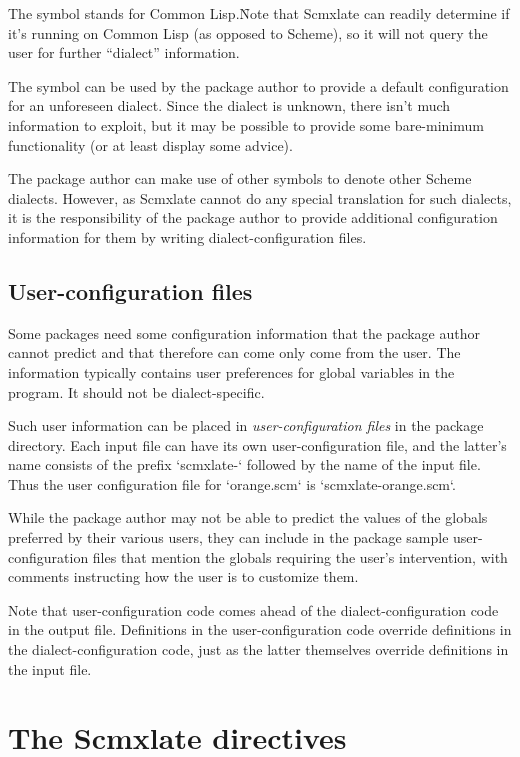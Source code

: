 The symbol  stands for
Common Lisp.\f{Note that
Scmxlate can readily determine if it’s running
on Common Lisp (as opposed to Scheme), so it will not query the user
for further “dialect” information.}

The symbol  can be used by the package author
to provide a default configuration for an unforeseen
dialect.  Since the dialect is unknown, there isn’t
much information to exploit, but it may be
possible to provide some bare-minimum functionality
(or at least display some advice).

The package author can make use of other symbols to
denote other Scheme dialects.  However, as Scmxlate
cannot do any special translation for such dialects, it
is the responsibility of the package author to provide
additional configuration information for them by
writing dialect-configuration files.

\subsection{User-configuration files}

Some packages need some configuration information that
the package author cannot predict and that therefore
can come only come from the user.  The information
typically contains user preferences for global
variables in the program.  It should not be
dialect-specific.

Such user information can be placed in {\em
user-configuration files} in the package directory.
Each input file can have its own
user-configuration file, and the latter’s name
consists of the prefix `scmxlate-` followed by the
name of the input file.  Thus the user configuration
file for `orange.scm` is `scmxlate-orange.scm`.

While the package author may not be able to predict the
values of the globals preferred by their various
users, they can include in the package sample
user-configuration files that mention the globals
requiring the user’s intervention, with comments
instructing how the user is to customize them.

Note that user-configuration code comes ahead of the
dialect-configuration code in the output file.
Definitions in the user-configuration code override
definitions in the dialect-configuration code, just
as the latter themselves override definitions in the
input file.

\section{The Scmxlate directives}
\label{glossary}

